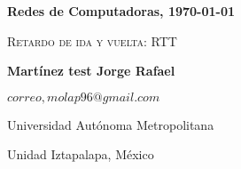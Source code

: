 \documentclass[letterpaper,11pt,twoside]{report}
\date{}
\begin{document}
	\centerline{\bf Redes de Computadoras, \today}
	\centerline{}
	\begin{center}
		\Large{\textsc{Retardo de ida y vuelta: RTT}}
	\end{center}
	
	\centerline{}
	\centerline{\textbf{Martínez test Jorge Rafael}}
	\centerline{}
	
	\centerline{$correo, molap96@gmail.com$}
	
        \centerline{Universidad Aut\'onoma Metropolitana} 
	\centerline{Unidad Iztapalapa, M\'exico}
	
	\bigskip
	
	
\end{document}
